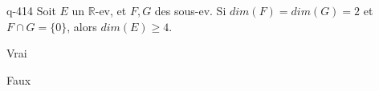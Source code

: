 \begin{truefalse}{q-414}
Soit $E$ un $\mathbb R$-ev, et $F,G$ des sous-ev. Si $dim(F)=dim(G)=2$ et $F \cap G=\{0\}$, alors $dim(E) \geq 4$.
\item* Vrai
\item Faux
\end{truefalse}

